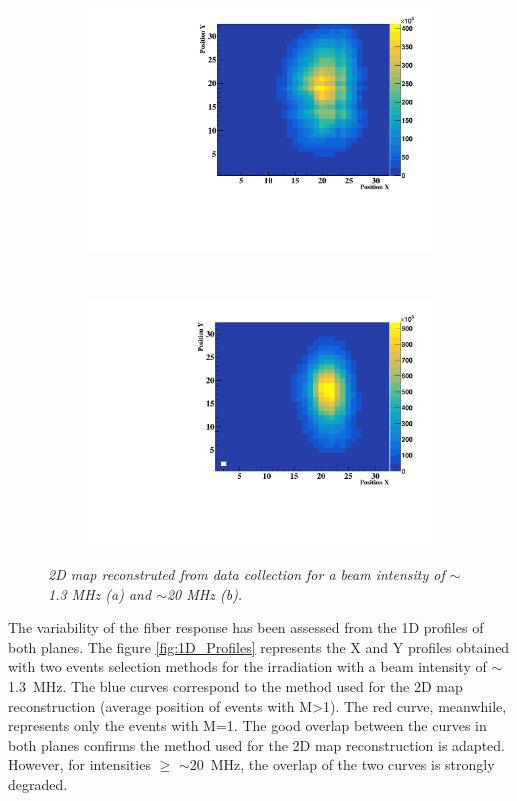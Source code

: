 \documentclass[a4paper,11pt]{article}
\begin{document}
\begin{figure}[H]
\centering
    \begin{subfigure}{0.45\textwidth} \centering \includegraphics[width=\textwidth]{figures/2D_Map_1MHz.pdf} \caption{} \label{fig:2D_1MHz}
    \end{subfigure}
    ~
    \begin{subfigure}{0.45\textwidth} \centering \includegraphics[width=\textwidth]{figures/2D_Map_20MHz.pdf} \caption{} \label{fig:2D_20MHz}
    \end{subfigure}
\caption{\small{\textit{2D map reconstruted from data collection for a beam intensity of $\sim$1.3 MHz (a) and $\sim$20 MHz (b).}}}
\label{fig:2D_Maps}
\end{figure}
The variability of the fiber response has been assessed from the 1D profiles of both planes. The figure \ref{fig:1D_Profiles} represents the X and Y profiles obtained with two events selection methods for the irradiation with a beam intensity of $\sim$1.3~MHz. The blue curves correspond to the method used  for the 2D map reconstruction (average position of events with M>1). The red curve, meanwhile, represents only the events with M=1. The good overlap between the curves in both planes confirms the method used for the 2D map reconstruction is adapted. However, for intensities $\geq$ $\sim$20~MHz, the overlap of the two curves is strongly degraded.\\
\end{document}
